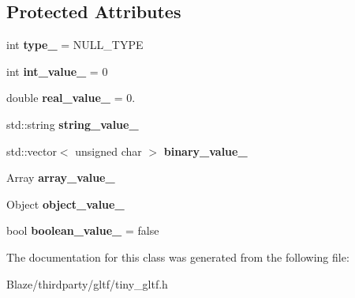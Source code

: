 \subsection*{Protected Attributes}
\begin{DoxyCompactItemize}
\item 
\mbox{\label{classtinygltf_1_1Value_ab3efa7e2cb38ae2574d16bcc8555839c}} 
int {\bfseries type\+\_\+} = N\+U\+L\+L\+\_\+\+T\+Y\+PE
\item 
\mbox{\label{classtinygltf_1_1Value_afb10625813c4f7f1c285a42f8ea11f97}} 
int {\bfseries int\+\_\+value\+\_\+} = 0
\item 
\mbox{\label{classtinygltf_1_1Value_a463574f062cd98aa536c7e4f8488aec7}} 
double {\bfseries real\+\_\+value\+\_\+} = 0.
\item 
\mbox{\label{classtinygltf_1_1Value_a8b8185da9182bd609b39ee57c2eb72f8}} 
std\+::string {\bfseries string\+\_\+value\+\_\+}
\item 
\mbox{\label{classtinygltf_1_1Value_a478e99be08eb9611ff30678a6ded21de}} 
std\+::vector$<$ unsigned char $>$ {\bfseries binary\+\_\+value\+\_\+}
\item 
\mbox{\label{classtinygltf_1_1Value_a4e7674babd934c04d53d149e0bd3d2c0}} 
Array {\bfseries array\+\_\+value\+\_\+}
\item 
\mbox{\label{classtinygltf_1_1Value_ac57d9a665b665016373c263f1792bff4}} 
Object {\bfseries object\+\_\+value\+\_\+}
\item 
\mbox{\label{classtinygltf_1_1Value_a9f252c0530d25a01b3047cbf8a43aefd}} 
bool {\bfseries boolean\+\_\+value\+\_\+} = false
\end{DoxyCompactItemize}


The documentation for this class was generated from the following file\+:\begin{DoxyCompactItemize}
\item 
Blaze/thirdparty/gltf/tiny\+\_\+gltf.\+h\end{DoxyCompactItemize}

